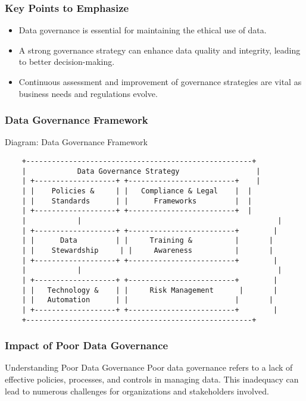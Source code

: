 \documentclass[aspectratio=169]{beamer}
\begin{document}
\begin{frame}[fragile]
    \frametitle{Key Points to Emphasize}
    \begin{itemize}
        \item Data governance is essential for maintaining the ethical use of data.
        \item A strong governance strategy can enhance data quality and integrity, leading to better decision-making.
        \item Continuous assessment and improvement of governance strategies are vital as business needs and regulations evolve.
    \end{itemize}
\end{frame}

\begin{frame}[fragile]
    \frametitle{Data Governance Framework}
    \begin{block}{Diagram: Data Governance Framework}
    \begin{verbatim}
    +-----------------------------------------------------+
    |            Data Governance Strategy                  |
    | +-------------------+ +-------------------------+    |
    | |    Policies &     | |   Compliance & Legal    |  |
    | |    Standards      | |      Frameworks         |  |
    | +-------------------+ +-------------------------+  |
    |            |                                              |
    | +-------------------+ +-------------------------+        |
    | |      Data         | |     Training &          |       |
    | |    Stewardship     | |     Awareness          |       |
    | +-------------------+ +-------------------------+        |
    |            |                                              |
    | +-------------------+ +-------------------------+        |
    | |   Technology &    | |     Risk Management      |       |
    | |   Automation      | |                         |       |
    | +-------------------+ +-------------------------+        |
    +-----------------------------------------------------+
    \end{verbatim}
    \end{block}
\end{frame}

\begin{frame}[fragile]
    \frametitle{Impact of Poor Data Governance}
    \begin{block}{Understanding Poor Data Governance}
        Poor data governance refers to a lack of effective policies, processes, and controls in managing data. This inadequacy can lead to numerous challenges for organizations and stakeholders involved.
    \end{block}
\end{frame}
\end{document}
